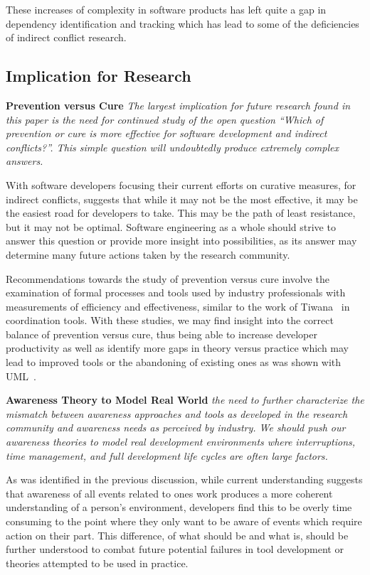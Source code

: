 \documentclass[conference]{IEEEtran}
\begin{document}
These increases of complexity in software products has left quite a gap in dependency identification and tracking which
has lead to some of the deficiencies of indirect conflict research.


\subsection{Implication for Research}
\label{sec:implr}

\textbf{Prevention versus Cure} \textit{The largest implication for future research found in this paper is the need for continued study of the open question
``Which of prevention or cure is more effective for software development and indirect conflicts?''. This simple question will undoubtedly
produce extremely complex answers.}

With software developers focusing their current efforts on curative measures, for
indirect conflicts, suggests
that while it may not be the most effective, it may be the easiest road for developers to take. This may be the path of
least resistance, but it may not be optimal. Software engineering as a whole should strive to answer this question or
provide more insight into possibilities, as its answer may determine many future actions taken by the research community.

Recommendations towards the study of prevention versus cure involve the examination of formal processes and tools used
by industry professionals with measurements of efficiency and effectiveness, similar to the work of
Tiwana~\cite{Tiwana:2008:ICD} in coordination tools. With these studies, we may find insight into the correct balance
of prevention versus cure, thus being able to increase developer productivity as well as identify more gaps in theory
versus practice which may lead to improved tools or the abandoning of existing ones as was shown with UML~\cite{Petre:2013:UP}.

\textbf{Awareness Theory to Model Real World} \textit{the need to further characterize the
mismatch between awareness approaches and tools as developed in the research community and awareness needs as perceived
by industry. We should push our awareness theories to model real development
environments where interruptions, time management, and full development life cycles are often large factors.}

As was identified in the previous discussion, while current understanding suggests that awareness of all events related to ones work
produces a more coherent understanding of a person's environment, developers find this to be overly time consuming
to the point where they only want to be aware of events which require action on their part. This difference, of what
should be and what is, should be further understood to combat future potential failures in
tool development or theories attempted to be used in practice.
\end{document}
